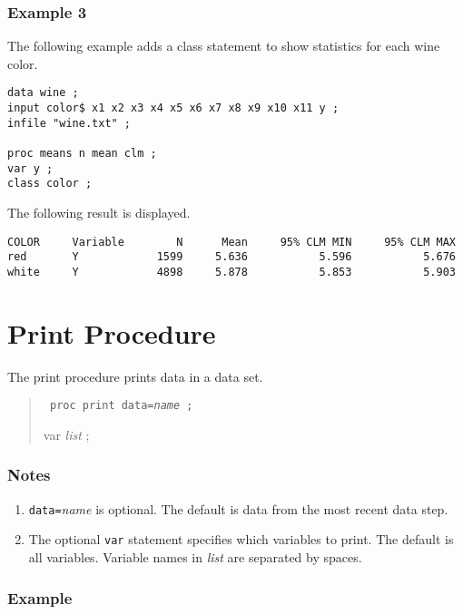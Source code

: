 \documentclass[12pt]{article}
\begin{document}
\subsubsection*{Example 3}

The following example adds a class statement
to show statistics for each wine color.

{\footnotesize\begin{verbatim}
data wine ;
input color$ x1 x2 x3 x4 x5 x6 x7 x8 x9 x10 x11 y ;
infile "wine.txt" ;

proc means n mean clm ;
var y ;
class color ;
\end{verbatim}}

The following result is displayed.

{\footnotesize\begin{verbatim}
COLOR     Variable        N      Mean     95% CLM MIN     95% CLM MAX
red       Y            1599     5.636           5.596           5.676
white     Y            4898     5.878           5.853           5.903
\end{verbatim}}

\newpage

\section{Print Procedure}

The print procedure prints data in a data set.

\begin{quote}
{\tt
proc print data={\it name} ;

var {\it list} ;
}
\end{quote}

\subsubsection*{Notes}

\begin{enumerate}
\item
{\tt data=}{\it name} is optional.
The default is data from the most recent data step.
\item
The optional {\tt var} statement specifies which variables
to print.
The default is all variables.
Variable names in {\it list} are separated by spaces.
\end{enumerate}

\subsubsection*{Example}
\end{document}
